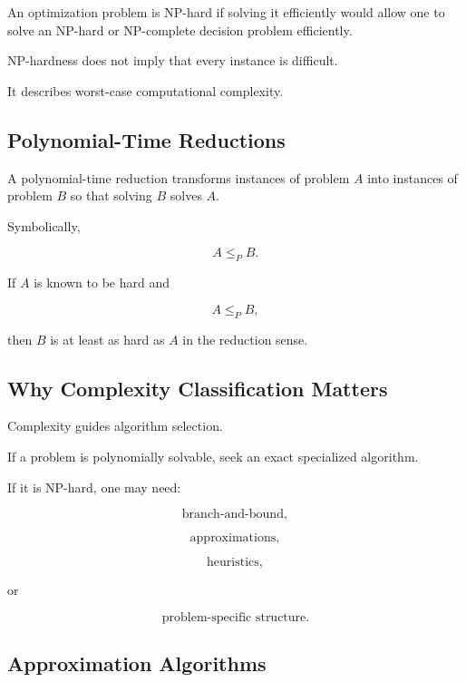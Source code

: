 An optimization problem is NP-hard if solving it efficiently would allow
one to solve an NP-hard or NP-complete decision problem efficiently.

NP-hardness does not imply that every instance is difficult.

It describes worst-case computational complexity.

\subsection{Polynomial-Time Reductions}
\label{subsec:polynomial-time-reductions}

A polynomial-time reduction transforms instances of problem \(A\) into
instances of problem \(B\) so that solving \(B\) solves \(A\).

Symbolically,

\[
\boxed{
A
\leq_P
B.
}
\]

If \(A\) is known to be hard and

\[
A\leq_P B,
\]

then \(B\) is at least as hard as \(A\) in the reduction sense.

\subsection{Why Complexity Classification Matters}
\label{subsec:why-complexity-matters}

Complexity guides algorithm selection.

If a problem is polynomially solvable, seek an exact specialized
algorithm.

If it is NP-hard, one may need:

\[
\boxed{
\text{branch-and-bound},
}
\]

\[
\boxed{
\text{approximations},
}
\]

\[
\boxed{
\text{heuristics},
}
\]

or

\[
\boxed{
\text{problem-specific structure}.
}
\]

\subsection{Approximation Algorithms}
\label{subsec:approximation-algorithms}

